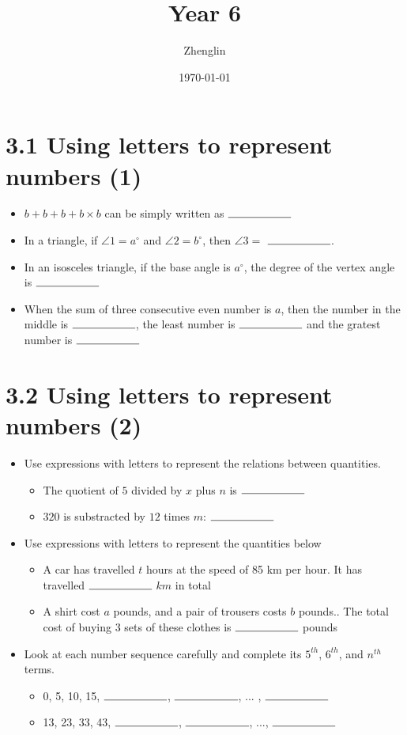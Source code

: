 \documentclass{article}%
\title{Year 6}%
\author{Zhenglin}%
\date{\today}%
\begin{document}
%
\normalsize%
\maketitle%
\section*{3.1 Using letters to represent numbers (1)}%
\begin{itemize}%
\item%
$b+b+b+b\times b$ can be simply written as $\rule{2cm}{0.15mm}$%
\item%
In a triangle, if $\angle 1=a^{\circ}$ and $\angle 2=b^{\circ}$, then $\angle 3=$ $\rule{2cm}{0.15mm}$.%
\item%
In an isosceles triangle, if the base angle is $a^{\circ}$, the degree of the vertex angle is $\rule{2cm}{0.15mm}$%
\item%
When the sum of three consecutive even number is $a$, then the number in the middle is $\rule{2cm}{0.15mm}$, the least number is $\rule{2cm}{0.15mm}$ and the gratest number is $\rule{2cm}{0.15mm}$%
\end{itemize}

%
\section*{3.2 Using letters to represent numbers (2)}%
\begin{itemize}%
\item%
Use expressions with letters to represent the relations between quantities.%
\begin{itemize}%
\item%
The quotient of $5$ divided by $x$ plus $n$ is $\rule{2cm}{0.15mm}$%
\item%
$320$ is substracted by $12$ times $m$: $\rule{2cm}{0.15mm}$%
\end{itemize}%
\item%
Use expressions with letters to represent the quantities below%
\begin{itemize}%
\item%
A car has travelled $t$ hours at the speed of 85 km per hour. It has travelled $\rule{2cm}{0.15mm}$ $km$ in total%
\item%
A shirt cost $a$ pounds, and a pair of trousers costs $b$ pounds.. The total cost of buying 3 sets of these clothes is $\rule{2cm}{0.15mm}$ pounds%
\end{itemize}%
\item%
Look at each number sequence carefully and complete its $5^{th}$, $6^{th}$, and $n^{th}$ terms.%
\begin{itemize}%
\item%
0, 5, 10, 15, $\rule{2cm}{0.15mm}$, $\rule{2cm}{0.15mm}$, ... , $\rule{2cm}{0.15mm}$%
\item%
13, 23, 33, 43, $\rule{2cm}{0.15mm}$, $\rule{2cm}{0.15mm}$, ..., $\rule{2cm}{0.15mm}$%
\end{itemize}%
\end{itemize}
\end{document}
